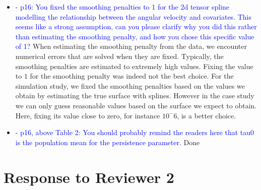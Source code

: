 \documentclass{amsart}
\theoremstyle{plain}
\theoremstyle{remark}
\newcommand {\1}{\mathbb{1}}
\begin{document}
\begin{itemize}
\item \textcolor{blue}{- p16: You fixed the smoothing penalties to 1 for the 2d tensor spline modelling the relationship between the angular velocity and covariates. This seems like a strong assumption, can you please clarify why you did this rather than estimating the smoothing penalty, and how you chose this specific value of 1?}
When estimating the smoothing penalty from the data, we encounter numerical errors that are solved when they are fixed. Typically, the smoothing penalties are estimated to extremely high values. Fixing the value to $1$ for the smoothing penalty was indeed not the best choice. For the simulation study, we fixed the smoothing penalties based on the values we obtain by estimating the true surface with splines. However in the case study we can only guess reasonable values based on the surface we expect to obtain. Here, fixing its value close to zero, for instance $10^-6$, is a better choice.

\item \textcolor{blue}{- p16, above Table 2: You should probably remind the readers here that tau0 is the population mean for the persistence parameter. } Done

\end{itemize}

\section{Response to Reviewer 2}
\end{document}
